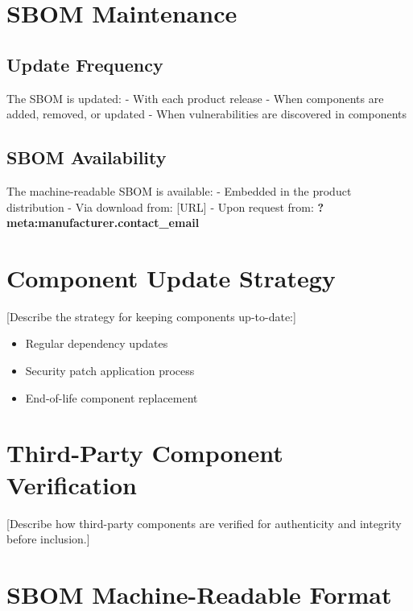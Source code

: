 \documentclass[
  11 pt,
  a4paper,
  table]{report}
\providecommand{\tightlist}{%
  \setlength{\itemsep}{0pt}\setlength{\parskip}{0pt}}\usepackage{longtable,booktabs,array}
\begin{document}
\section{SBOM Maintenance}\label{sbom-maintenance}

\subsection{Update Frequency}\label{update-frequency}

The SBOM is updated: - With each product release - When components are
added, removed, or updated - When vulnerabilities are discovered in
components

\subsection{SBOM Availability}\label{sbom-availability}

The machine-readable SBOM is available: - Embedded in the product
distribution - Via download from: {[}URL{]} - Upon request from:
\textbf{?meta:manufacturer.contact\_email}

\section{Component Update Strategy}\label{component-update-strategy}

{[}Describe the strategy for keeping components up-to-date:{]}

\begin{itemize}
\tightlist
\item
  Regular dependency updates
\item
  Security patch application process
\item
  End-of-life component replacement
\end{itemize}

\section{Third-Party Component
Verification}\label{third-party-component-verification}

{[}Describe how third-party components are verified for authenticity and
integrity before inclusion.{]}

\section{SBOM Machine-Readable
Format}\label{sbom-machine-readable-format}
\end{document}

